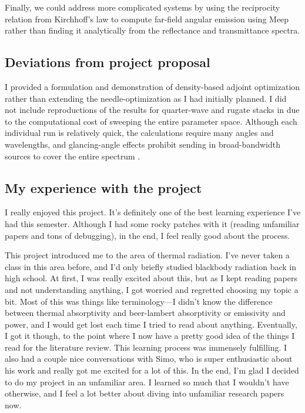 \documentclass[%
 reprint,
 amsmath,amssymb,
 aps
]{revtex4-2}
\begin{document}
Finally, we could address more complicated systems by using the reciprocity relation from Kirchhoff's law to compute far-field angular emission using Meep rather than finding it analytically from the reflectance and transmittance spectra.


\subsection{Deviations from project proposal}
I provided a formulation and demonstration of density-based adjoint optimization rather than extending the needle-optimization as I had initially planned. I did not include reproductions of the results for quarter-wave and rugate stacks in \cite{ilic} due to the computational cost of sweeping the entire parameter space. Although each individual run is relatively quick, the calculations require many angles and wavelengths, and glancing-angle effects prohibit sending in broad-bandwidth sources to cover the entire spectrum \cite{meep_tutorial}. 




\subsection{My experience with the project}
I really enjoyed this project. It's definitely one of the best learning experience I've had this semester. Although I had some rocky patches with it (reading unfamiliar papers and tons of debugging), in the end, I feel really good about the process.

This project introduced me to the area of thermal radiation. I've never taken a class in this area before, and I'd only briefly studied blackbody radiation back in high school. At first, I was really excited about this, but as I kept reading papers and not understanding anything, I got worried and regretted choosing my topic a bit. Most of this was things like terminology---I didn't know the difference between thermal absorptivity and beer-lambert absorptivity or emissivity and power, and I would get lost each time I tried to read about anything. Eventually, I got it though, to the point where I now have a pretty good idea of the things I read for the literature review. This learning process was immensely fulfilling. I also had a couple nice conversations with Simo, who is super enthusiastic about his work and really got me excited for a lot of this. In the end, I'm glad I decided to do my project in an unfamiliar area. I learned so much that I wouldn't have otherwise, and I feel a lot better about diving into unfamiliar research papers now. 
\end{document}
